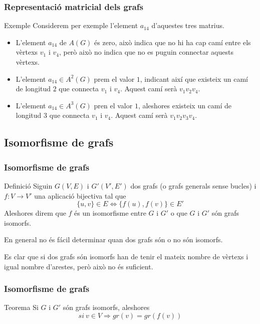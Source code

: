 \documentclass{beamer}
\begin{document}
\begin{frame}
\frametitle{Representació matricial dels grafs}
\begin{block}{Exemple}
Considerem per exemple l'element $a_{14}$ d'aquestes tres matrius. 
\begin{itemize}
\item L'element $a_{14}$ de $A(G)$ és zero, això indica que no hi ha cap camí entre els vèrtexs $v_1$ i $v_4$, però això no indica que no es puguin connectar aquests vèrtexs. 

\item L'element $a_{14} \in A^2(G)$ prem el valor $1$, indicant així que existeix un camí de longitud $2$ que connecta $v_1$ i $v_4$. Aquest camí serà $v_1v_2v_4$.

\item L'element $a_{14}\in A^3(G)$ pren el valor $1$, aleshores existeix  un camí de longitud $3$ que connecta $v_1$ i $v_4$. Aquest camí serà $v_1v_2v_3v_4$.
\end{itemize}
\end{block}
\end{frame}

\subsection{Isomorfisme de grafs}

\begin{frame}
\frametitle{Isomorfisme de grafs}
\begin{block}{Definició}
Siguin $G(V,E)$ i $G'(V',E')$ dos grafs (o grafs generals sense bucles) i $f:V\longrightarrow V'$ una aplicació bijectiva tal que \[\{u,v\}\in E \Longleftrightarrow \{f(u),f(v)\}\in E'\]
Aleshores direm que $f$ és un isomorfisme entre $G$ i $G'$ o que $G$ i $G'$ són grafs isomorfs. 
\end{block}
En general no és fácil determinar quan dos grafs són o no són isomorfs.

Es clar que si dos grafs són isomorfs han de tenir el mateix nombre de vèrtexs i igual nombre d'arestes, però això no és suficient. 
\end{frame}

\begin{frame}
\frametitle{Isomorfisme de grafs}
\begin{block}{Teorema}
Si $G$ i $G'$ són grafs isomorfs, aleshores
\[si\ v\in V \Longrightarrow gr(v) = gr(f(v))\]
\end{block}
\end{frame}
\end{document}
